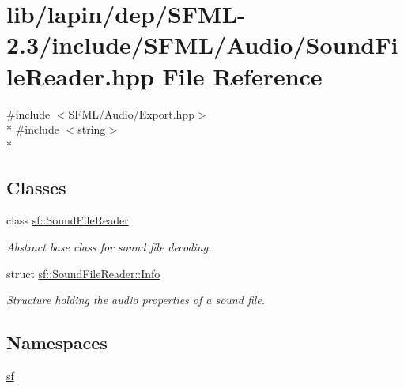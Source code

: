 \hypertarget{lapin_2dep_2_s_f_m_l-2_83_2include_2_s_f_m_l_2_audio_2_sound_file_reader_8hpp}{\section{lib/lapin/dep/\-S\-F\-M\-L-\/2.3/include/\-S\-F\-M\-L/\-Audio/\-Sound\-File\-Reader.hpp File Reference}
\label{lapin_2dep_2_s_f_m_l-2_83_2include_2_s_f_m_l_2_audio_2_sound_file_reader_8hpp}
}
{\ttfamily \#include $<$S\-F\-M\-L/\-Audio/\-Export.\-hpp$>$}\\*
{\ttfamily \#include $<$string$>$}\\*
\subsection*{Classes}
\begin{DoxyCompactItemize}
\item 
class \hyperlink{classsf_1_1_sound_file_reader}{sf\-::\-Sound\-File\-Reader}
\begin{DoxyCompactList}\small\item\em Abstract base class for sound file decoding. \end{DoxyCompactList}\item 
struct \hyperlink{structsf_1_1_sound_file_reader_1_1_info}{sf\-::\-Sound\-File\-Reader\-::\-Info}
\begin{DoxyCompactList}\small\item\em Structure holding the audio properties of a sound file. \end{DoxyCompactList}\end{DoxyCompactItemize}
\subsection*{Namespaces}
\begin{DoxyCompactItemize}
\item 
\hyperlink{namespacesf}{sf}
\end{DoxyCompactItemize}
